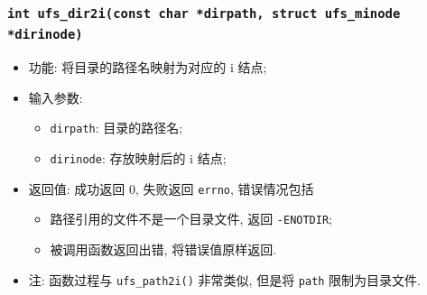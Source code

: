 \documentclass[nofonts]{ctexart}
\begin{document}
  \subsubsection{\texttt{int ufs\_dir2i(const char *dirpath, struct ufs\_minode *dirinode)}}

  \begin{itemize}
\item
  功能: 将目录的路径名映射为对应的 i 结点;
\item
  输入参数:

  \begin{itemize}
  \item
    \texttt{dirpath}: 目录的路径名;
  \item
    \texttt{dirinode}: 存放映射后的 i 结点;
  \end{itemize}
\item
  返回值: 成功返回 0, 失败返回 \texttt{errno}, 错误情况包括

  \begin{itemize}
  \item
    路径引用的文件不是一个目录文件, 返回 \texttt{-ENOTDIR};
  \item
    被调用函数返回出错, 将错误值原样返回.
  \end{itemize}
\item
  注: 函数过程与 \texttt{ufs\_path2i()} 非常类似, 但是将 \texttt{path}
  限制为目录文件.
  \end{itemize}
\end{document}
